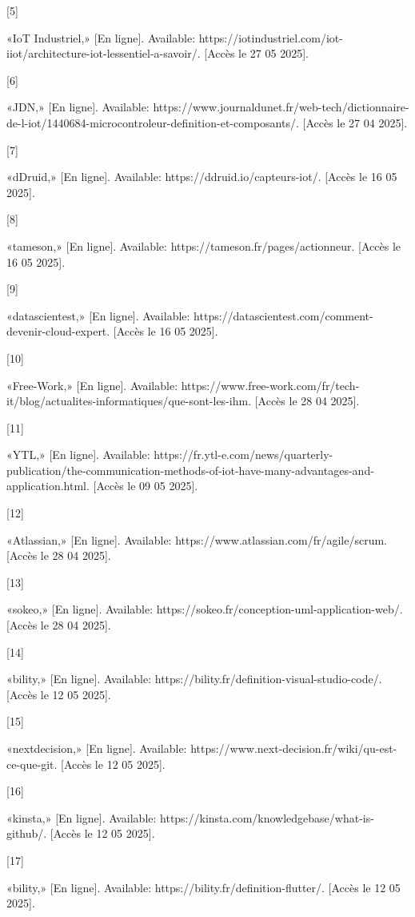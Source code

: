 \documentclass{article}
\begin{document}
[5] 

«IoT Industriel,» [En ligne]. Available: https://iotindustriel.com/iot-iiot/architecture-iot-lessentiel-a-savoir/. [Accès le 27 05 2025].

[6] 

«JDN,» [En ligne]. Available: https://www.journaldunet.fr/web-tech/dictionnaire-de-l-iot/1440684-microcontroleur-definition-et-composants/. [Accès le 27 04 2025].

[7] 

«dDruid,» [En ligne]. Available: https://ddruid.io/capteurs-iot/. [Accès le 16 05 2025].

[8] 

«tameson,» [En ligne]. Available: https://tameson.fr/pages/actionneur. [Accès le 16 05 2025].

[9] 

«datascientest,» [En ligne]. Available: https://datascientest.com/comment-devenir-cloud-expert. [Accès le 16 05 2025].

[10] 

«Free-Work,» [En ligne]. Available: https://www.free-work.com/fr/tech-it/blog/actualites-informatiques/que-sont-les-ihm. [Accès le 28 04 2025].

[11] 

«YTL,» [En ligne]. Available: https://fr.ytl-e.com/news/quarterly-publication/the-communication-methods-of-iot-have-many-advantages-and-application.html. [Accès le 09 05 2025].

[12] 

«Atlassian,» [En ligne]. Available: https://www.atlassian.com/fr/agile/scrum. [Accès le 28 04 2025].

[13] 

«sokeo,» [En ligne]. Available: https://sokeo.fr/conception-uml-application-web/. [Accès le 28 04 2025].

[14] 

«bility,» [En ligne]. Available: https://bility.fr/definition-visual-studio-code/. [Accès le 12 05 2025].

[15] 

«nextdecision,» [En ligne]. Available: https://www.next-decision.fr/wiki/qu-est-ce-que-git. [Accès le 12 05 2025].

[16] 

«kinsta,» [En ligne]. Available: https://kinsta.com/knowledgebase/what-is-github/. [Accès le 12 05 2025].

[17] 

«bility,» [En ligne]. Available: https://bility.fr/definition-flutter/. [Accès le 12 05 2025].
\end{document}
